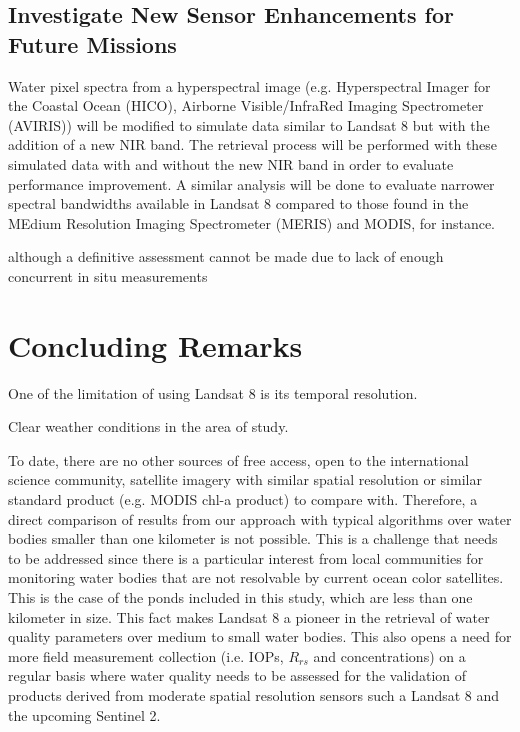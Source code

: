 \subsection{Investigate New Sensor Enhancements for Future Missions}
Water pixel spectra from a hyperspectral image (e.g. Hyperspectral Imager for the Coastal Ocean (HICO),  Airborne Visible/InfraRed Imaging Spectrometer (AVIRIS)) will be modified to simulate data similar to Landsat 8 but with the addition of a new NIR band. The retrieval process will be performed with these simulated data with and without the new NIR band in order to evaluate performance improvement. A similar analysis will be done to evaluate narrower spectral bandwidths available in Landsat 8 compared to those found in the MEdium Resolution Imaging Spectrometer (MERIS) and MODIS, for instance. 

although a definitive assessment cannot be made due to lack of enough concurrent in situ measurements

\section{Concluding Remarks}

One of the limitation of using Landsat 8 is its temporal resolution.

Clear weather conditions in the area of study.

To date, there are no other sources of free access, open to the international science community, satellite imagery with similar spatial resolution or similar standard product (e.g. MODIS chl-a product) to compare with. Therefore, a direct comparison of results from our approach with typical algorithms over water bodies smaller than one kilometer is not possible. This is a challenge that needs to be addressed since there is a particular interest from local communities for monitoring water bodies that are not resolvable by current ocean color satellites. This is the case of the ponds included in this study, which are less than one kilometer in size. This fact makes Landsat 8 a pioneer in the retrieval of water quality parameters over medium to small water bodies. This also opens a need for more field measurement collection (i.e. IOPs, $R_{rs}$ and concentrations) on a regular basis where water quality needs to be assessed for the validation of products derived from moderate spatial resolution sensors such a Landsat 8 and the upcoming Sentinel 2. 